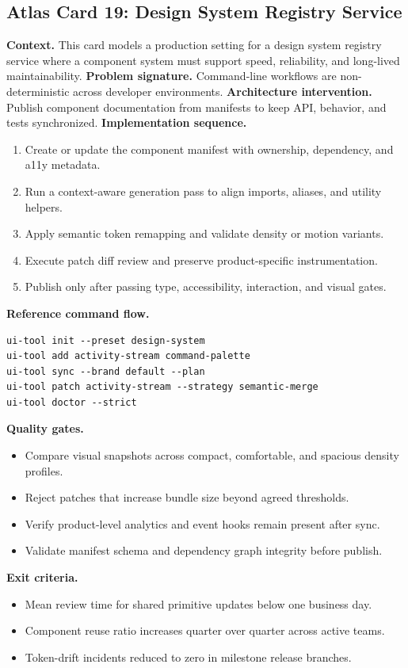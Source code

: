 \subsection*{Atlas Card 19: Design System Registry Service}
\textbf{Context.} This card models a production setting for a design system registry service where a component system must support speed, reliability, and long-lived maintainability.
\textbf{Problem signature.} Command-line workflows are non-deterministic across developer environments.
\textbf{Architecture intervention.} Publish component documentation from manifests to keep API, behavior, and tests synchronized.
\textbf{Implementation sequence.}
\begin{enumerate}[leftmargin=*, itemsep=0.28em]
  \item Create or update the component manifest with ownership, dependency, and a11y metadata.
  \item Run a context-aware generation pass to align imports, aliases, and utility helpers.
  \item Apply semantic token remapping and validate density or motion variants.
  \item Execute patch diff review and preserve product-specific instrumentation.
  \item Publish only after passing type, accessibility, interaction, and visual gates.
\end{enumerate}
\textbf{Reference command flow.}
\begin{verbatim}
ui-tool init --preset design-system
ui-tool add activity-stream command-palette
ui-tool sync --brand default --plan
ui-tool patch activity-stream --strategy semantic-merge
ui-tool doctor --strict
\end{verbatim}
\textbf{Quality gates.}
\begin{itemize}[leftmargin=*, itemsep=0.24em]
  \item Compare visual snapshots across compact, comfortable, and spacious density profiles.
  \item Reject patches that increase bundle size beyond agreed thresholds.
  \item Verify product-level analytics and event hooks remain present after sync.
  \item Validate manifest schema and dependency graph integrity before publish.
\end{itemize}
\textbf{Exit criteria.}
\begin{itemize}[leftmargin=*, itemsep=0.24em]
  \item Mean review time for shared primitive updates below one business day.
  \item Component reuse ratio increases quarter over quarter across active teams.
  \item Token-drift incidents reduced to zero in milestone release branches.
\end{itemize}
\clearpage
